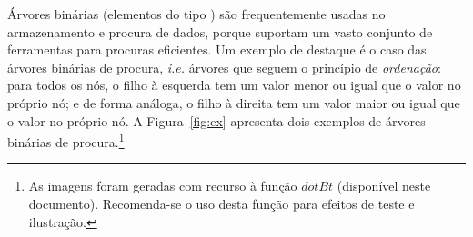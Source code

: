 \documentclass[a4paper]{article}
\newcommand{\Varid}[1]{\mathit{#1}}
\begin{document}
\Problema

Árvores binárias (elementos do tipo \BTree) são
    frequentemente usadas no armazenamento e procura de dados, porque
    suportam um vasto conjunto de ferramentas para procuras
    eficientes. Um exemplo de destaque é o caso das
    \href{https://en.wikipedia.org/wiki/Binary_search_tree}{árvores
    binárias de procura}, \emph{i.e.} árvores que seguem o
    princípio de \emph{ordenação}: para todos os nós,
    o filho à esquerda tem um
    valor menor ou igual que o valor no próprio nó; e de forma
     análoga, o filho à direita
    tem um valor maior ou igual que o valor no próprio nó.
    A Figura~\ref{fig:ex} apresenta dois exemplos de árvores binárias de procura.\footnote{
    As imagens foram geradas com recurso à função \ensuremath{\Varid{dotBt}} (disponível
    neste documento). Recomenda-se o
    uso desta função para efeitos de teste e ilustração.}
\end{document}
